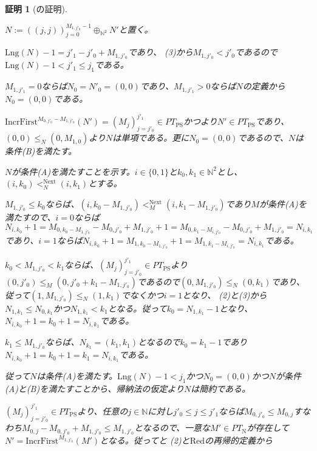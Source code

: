 \documentclass[dvipdfmx,uplatex]{jsarticle}
\theoremstyle{customnonumberbreakfortheorem}
\theoremstyle{customnonumberbreakforproof}
\newtheorem{hideableproof}{証明}
\begin{document}
\begin{hideableproof}[の証明]
\begin{indented}
\begin{indented}
\begin{indented}
				\begin{indented}
					\item \(N := ((j,j))_{j=0}^{M_{1,j'_0}-1} \oplus_{\mathbb{N}^2} N'\)と置く。
					\item \(\textrm{Lng}(N)-1 = j'_1-j'_0+M_{1,j'_0}\)であり、 (3)から\(M_{1,j'_0} < j'_0\)であるので\(\textrm{Lng}(N)-1 < j'_1 \leq j_1\)である。
					\item \(M_{1,j'_1} = 0\)ならば\(N_0 = N'_0 = (0,0)\)であり、\(M_{1,j'_1} > 0\)ならば\(N\)の定義から\(N_0 = (0,0)\)である。
					\item \(\textrm{IncrFirst}^{M_{0,j'_0}-M_{1,j'_0}}(N') = (M_j)_{j=j'_0}^{j'_1} \in PT_{\textrm{PS}}\)かつより\(N' \in PT_{\textrm{PS}}\)であり、\((0,0) \leq_N (0,M_{1,0})\)より\(N\)は単項である。更に\(N_0 = (0,0)\)であるので、\(N\)は条件(B)を満たす。
					\item \(N\)が条件(A)を満たすことを示す。\(i \in \{0,1\}\)と\(k_0,k_1 \in \mathbb{N}^2\)とし、\((i,k_0) <_N^{\textrm{Next}} (i,k_1)\)とする。
					\begin{indented}
						\item \(M_{1,j'_0} \leq k_0\)ならば、\((i,k_0-M_{1,j'_0}) <_M^{\textrm{Next}} (i,k_1-M_{1,j'_0})\)であり\(M\)が条件(A)を満たすので、\(i=0\)ならば\(N_{i,k_0}+1 = M_{0,k_0-M_{1,j'_0}}-M_{0,j'_0}+M_{1,j'_0}+1 = M_{0,k_1-M_{i,j'_0}}-M_{0,j'_0}+M_{1,j'_0} = N_{i,k_1}\)であり、\(i=1\)ならば\(N_{i,k_0}+1 = M_{1,k_0-M_{1,j'_0}}+1 = M_{1,k_1-M_{i,j'_0}} = N_{i,k_1}\)である。
						\item \(k_0 < M_{1,j'_0} < k_1\)ならば、\((M_j)_{j=j'_0}^{j'_1} \in PT_{\textrm{PS}}\)より\((0,j'_0) \leq_M (0,j'_0+k_1-M_{1,j'_0})\)であるので\((0,M_{1,j'_0}) \leq_N (0,k_1)\)であり、従って\((1,M_{1,j'_0}) \leq_N (1,k_1)\)でなくかつ\(i=1\)となり、 (2)と(3)から\(N_{1,k_1} \leq N_{0,k_1}\)かつ\(N_{1,k_1} < k_1\)となる。従って\(k_0 = N_{1,k_1}-1\)となり、\(N_{i,k_0}+1 = k_0+1 = N_{i,k_1}\)である。
						\item \(k_1 \leq M_{1,j'_0}\)ならば、\(N_{k_1} = (k_1,k_1)\)となるので\(k_0 = k_1-1\)であり\(N_{i,k_0}+1 = k_0+1 = k_1 = N_{i,k_1}\)である。
					\end{indented}
					\item 従って\(N\)は条件(A)を満たす。\(\textrm{Lng}(N)-1 < j_1\)かつ\(N_0 = (0,0)\)かつ\(N\)が条件(A)と(B)を満たすことから、帰納法の仮定より\(N\)は簡約である。
					\item \((M_j)_{j=j'_0}^{j'_1} \in PT_{\textrm{PS}}\)より、任意の\(j \in \mathbb{N}\)に対し\(j'_0 \leq j \leq j'_1\)ならば\(M_{0,j'_0} \leq M_{0,j}\)すなわち\(M_{0,j}-M_{0,j'_0}+M_{1,j'_0} \leq M_{1,j'_0}\)となるので、一意な\(M' \in PT_{\textrm{N}}\)が存在して\(N' = \textrm{IncrFirst}^{M_{1,j'_0}}(M')\)となる。従ってと (2)と\(\textrm{Red}\)の再帰的定義から

\end{indented}
\end{indented}
\end{indented}
\end{indented}
\end{hideableproof}
\end{document}
